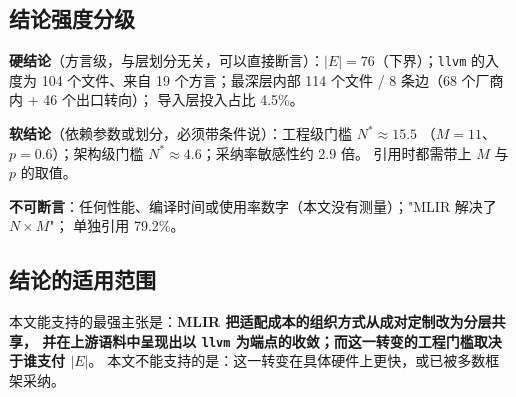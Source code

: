 \subsection{结论强度分级}

\textbf{硬结论}（方言级，与层划分无关，可以直接断言）：$|E|=76$（下界）；\texttt{llvm} 的入度为
104 个文件、来自 19 个方言；最深层内部 114 个文件 / 8 条边（68 个厂商内 + 46 个出口转向）；
导入层投入占比 4.5\%。

\textbf{软结论}（依赖参数或划分，必须带条件说）：工程级门槛 $N^{*}\approx 15.5$
（$M=11$、$p=0.6$）；架构级门槛 $N^{*}\approx 4.6$；采纳率敏感性约 2.9 倍。
引用时都需带上 $M$ 与 $p$ 的取值。

\textbf{不可断言}：任何性能、编译时间或使用率数字（本文没有测量）；"MLIR 解决了 $N\times M$"；
单独引用 79.2\%。

\subsection{结论的适用范围}

本文能支持的最强主张是：\textbf{MLIR 把适配成本的组织方式从成对定制改为分层共享，
并在上游语料中呈现出以 \texttt{llvm} 为端点的收敛；而这一转变的工程门槛取决于谁支付 $|E|$}。
本文不能支持的是：这一转变在具体硬件上更快，或已被多数框架采纳。
